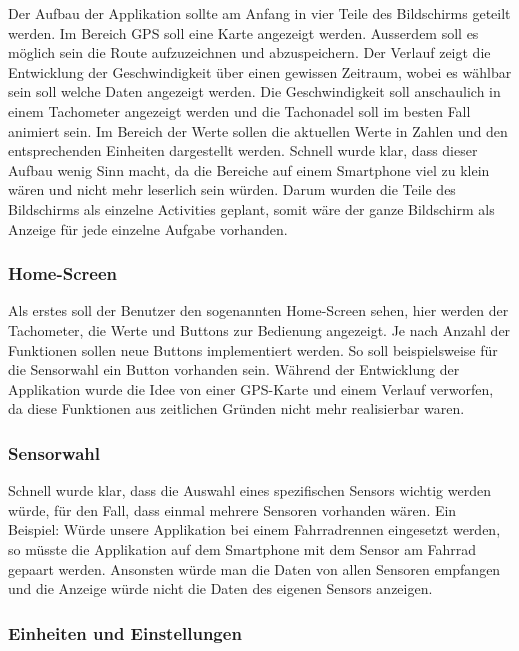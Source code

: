 Der Aufbau der Applikation sollte am Anfang in vier Teile des Bildschirms geteilt werden. 
Im Bereich GPS soll eine Karte angezeigt werden. Ausserdem soll es möglich sein die Route aufzuzeichnen und abzuspeichern.
Der Verlauf zeigt die Entwicklung der Geschwindigkeit über einen gewissen Zeitraum, wobei es wählbar sein soll welche Daten angezeigt werden.
Die Geschwindigkeit soll anschaulich in einem Tachometer angezeigt werden und die Tachonadel soll im besten Fall animiert sein.
Im Bereich der Werte sollen die aktuellen Werte in Zahlen und den entsprechenden Einheiten dargestellt werden.
Schnell wurde klar, dass dieser Aufbau wenig Sinn macht, da die Bereiche auf einem Smartphone viel zu klein wären und nicht mehr leserlich sein würden. Darum wurden die Teile des Bildschirms als einzelne Activities geplant, somit wäre der ganze Bildschirm als Anzeige für jede einzelne Aufgabe vorhanden.

\subsubsection{Home-Screen}

Als erstes soll der Benutzer den sogenannten Home-Screen sehen, hier werden der Tachometer, die Werte und Buttons zur Bedienung angezeigt. Je nach Anzahl der Funktionen sollen neue Buttons implementiert werden. So soll beispielsweise für die Sensorwahl ein Button vorhanden sein. Während der Entwicklung der Applikation wurde die Idee von einer GPS-Karte und einem Verlauf verworfen, da diese Funktionen aus zeitlichen Gründen nicht mehr realisierbar waren.

\subsubsection{Sensorwahl}

Schnell wurde klar, dass die Auswahl eines spezifischen Sensors wichtig werden würde, für den Fall, dass einmal mehrere Sensoren vorhanden wären. Ein Beispiel: Würde unsere Applikation bei einem Fahrradrennen eingesetzt werden, so müsste die Applikation auf dem Smartphone mit dem Sensor am Fahrrad gepaart werden. Ansonsten würde man die Daten von allen Sensoren empfangen und die Anzeige würde nicht die Daten des eigenen Sensors anzeigen.

\subsubsection{Einheiten und Einstellungen}


